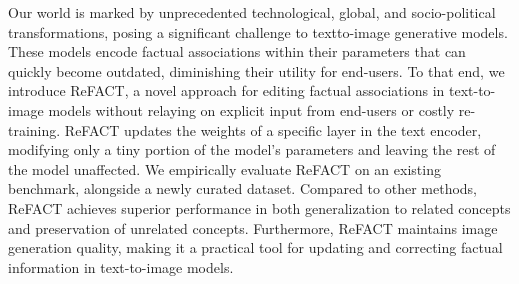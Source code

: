 Our world is marked by unprecedented technological, global, and socio-political transformations, posing a significant challenge to textto-image generative models.  These models encode factual associations within their parameters that can quickly become outdated, diminishing their utility for end-users.  To that end, we introduce ReFACT, a novel approach for editing factual associations in text-to-image models without relaying on explicit input from end-users or costly re-training.  ReFACT updates the weights of a specific layer in the text encoder, modifying only a tiny portion of the model’s parameters and leaving the rest of the model unaffected. We empirically evaluate ReFACT on an existing benchmark, alongside a newly curated dataset. Compared to other methods, ReFACT achieves superior performance in both generalization to related concepts and preservation of unrelated concepts. Furthermore, ReFACT maintains image generation quality, making it a practical tool for updating and correcting factual information in text-to-image models.